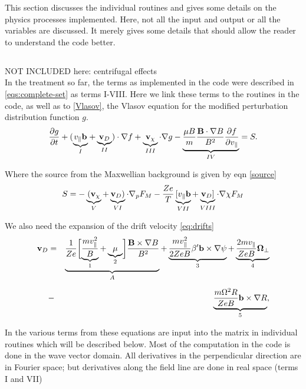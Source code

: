 This section discusses the individual routines and gives some details on the physics 
processes implemented. Here, not all the input and output or all the variables are 
discussed. It merely gives some details that should allow the reader to understand
the code better. 

\subsection{} %
NOT INCLUDED here: centrifugal effects\\

In the treatment so far, the terms as implemented in the code were described in \ref{eqs:complete-set} as terms I-VIII. Here we link these terms to the routines in the code, as well as to \ref{Vlasov}, the Vlasov equation for the modified perturbation distribution function $g$.
\begin{equation} 
\label{1}
{\partial g \over \partial t} + (\underbrace{v_\parallel {\bf b}}_{I} + \underbrace{{\bf v}_D}_{II}) \cdot \nabla f + \underbrace{{\bf v}_\chi}_{III} \cdot \nabla g  
-\underbrace{{\mu B \over m}{{\bf B}\cdot \nabla B \over B^2}{\partial f \over \partial v_\parallel}}_{IV} = S. 
\end{equation}

Where the source from the Maxwellian background is given by eqn \ref{source}
\begin{equation} 
\label{2}
S =  - \underbrace{({\bf v}_\chi}_{V} + \underbrace{{\bf v}_D)}_{VI} \cdot \nabla_p F_M
-  {Ze \over T} \underbrace{[ v_\parallel {\bf b}}_{VII} + \underbrace{{\bf v}_D ]}_{VIII} \cdot \nabla \chi F_M  
\end{equation}

We also need the expansion of the drift velocity \ref{eq:drifts}
\begin{align}
\label{3}
{\bf v}_D &=& \underbrace{{1\over Ze} \biggl [ \underbrace{{m v_\parallel^2\over B}}_{1} + \underbrace{\mu}_{2} \biggr ] {{\bf B} \times \nabla B
\over B^2}}_{A} + \underbrace{{m v_\parallel^2 \over 2 Z e B} \beta^\prime {\bf b} \times \nabla \psi}_{3} 
 + \underbrace{{ 2 m v_\parallel \over Z e B } {\bf \Omega}_\perp}_{4} \cr 
\noalign{\vskip 0.2 truecm} 
&-& \underbrace{{m \Omega^2 R \over Z e B }  {\bf b} \times {\nabla R}}_{5}, 
\end{align}

In  the various terms from these equations are input into the matrix in individual routines which will be described below.  Most of the computation in the code is done in the wave vector domain. All derivatives in the perpendicular direction are in Fourier space; but derivatives along the field line are done in real space (terms I and VII)


